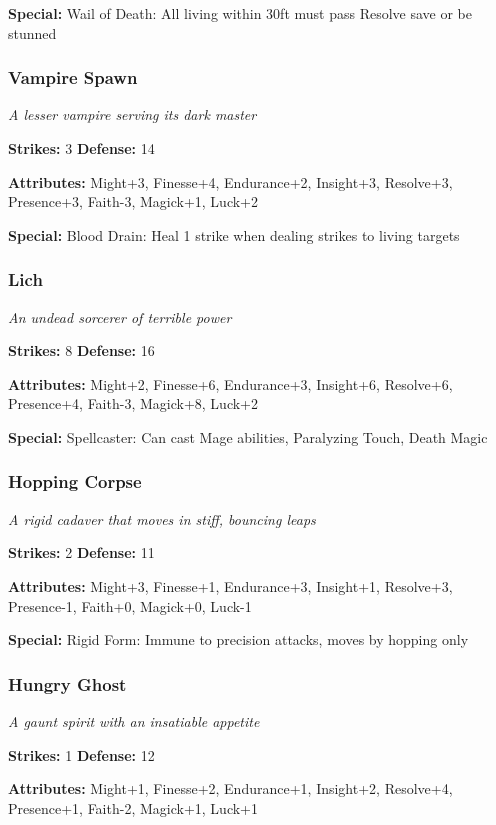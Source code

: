 \documentclass[10pt,twoside]{article}
\begin{document}
\textbf{Special:} Wail of Death: All living within 30ft must pass Resolve save or be stunned

\subsubsection{Vampire Spawn}
\textit{A lesser vampire serving its dark master}

\textbf{Strikes:} 3 \quad \textbf{Defense:} 14

\textbf{Attributes:} Might+3, Finesse+4, Endurance+2, Insight+3, Resolve+3, Presence+3, Faith-3, Magick+1, Luck+2

\textbf{Special:} Blood Drain: Heal 1 strike when dealing strikes to living targets

\subsubsection{Lich}
\textit{An undead sorcerer of terrible power}

\textbf{Strikes:} 8 \quad \textbf{Defense:} 16

\textbf{Attributes:} Might+2, Finesse+6, Endurance+3, Insight+6, Resolve+6, Presence+4, Faith-3, Magick+8, Luck+2

\textbf{Special:} Spellcaster: Can cast Mage abilities, Paralyzing Touch, Death Magic

\subsubsection{Hopping Corpse}
\textit{A rigid cadaver that moves in stiff, bouncing leaps}

\textbf{Strikes:} 2 \quad \textbf{Defense:} 11

\textbf{Attributes:} Might+3, Finesse+1, Endurance+3, Insight+1, Resolve+3, Presence-1, Faith+0, Magick+0, Luck-1

\textbf{Special:} Rigid Form: Immune to precision attacks, moves by hopping only

\subsubsection{Hungry Ghost}
\textit{A gaunt spirit with an insatiable appetite}

\textbf{Strikes:} 1 \quad \textbf{Defense:} 12

\textbf{Attributes:} Might+1, Finesse+2, Endurance+1, Insight+2, Resolve+4, Presence+1, Faith-2, Magick+1, Luck+1
\end{document}
